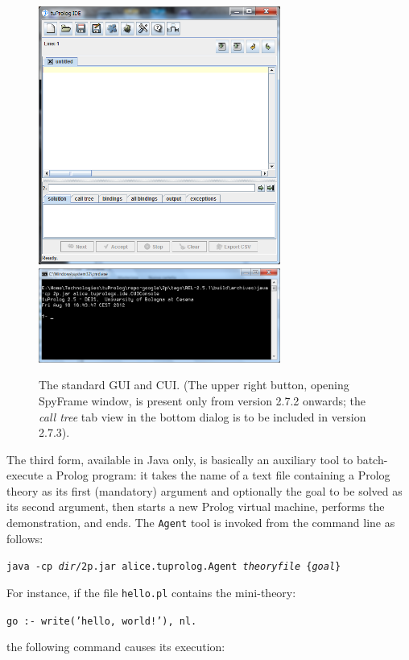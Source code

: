 \begin{figure}
\centering
  \includegraphics[width=300px]{images/tuprologIDE.png}\\
  \includegraphics[width=300px]{images/tuprologCUI.png}\\
  \caption{The standard \tuprolog{} GUI and CUI. (The upper right button, opening SpyFrame window, is present only from version 2.7.2 onwards; the \textit{call tree} tab view in the bottom dialog is to be included in version 2.7.3).}\label{fig:tuprologGUICUI}
\end{figure}

The third form, available in Java only, is basically an auxiliary tool to batch-execute a Prolog program: it takes the name of a text file containing a Prolog theory as its first (mandatory) argument and optionally the goal to be solved as its second argument, then starts a new Prolog virtual machine, performs the demonstration, and ends.
%
The \texttt{Agent} tool is invoked from the command line as follows:

\texttt{java -cp \textit{dir}/2p.jar alice.tuprolog.Agent \textit{theoryfile}
\{\textit{goal}\}}

\noindent For instance, if the file \verb|hello.pl| contains the mini-theory:

\texttt{go :- write('hello, world!'), nl.}

\noindent the following command causes its execution:

